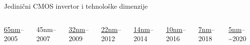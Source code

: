 \begin{frame}[label=09_2-s047]{Jedinični CMOS invertor i tehnološke dimenzije}
{\begin{columns}[T,onlytextwidth]
\href{https://en.wikipedia.org/wiki/65_nm_process}{{\color{DEplava}\underline{65nm}}}–2005
\par\smallskip
45nm–2007\raggedright \href{https://en.wikipedia.org/wiki/32_nm_process}{{\color{DEplava}\underline{32nm}}}–2009
\par\smallskip
\href{https://en.wikipedia.org/wiki/22_nm_process}{{\color{DEplava}\underline{22nm}}}–2012
\par\smallskip
\href{https://en.wikipedia.org/wiki/14_nm_process}{{\color{DEplava}\underline{14nm}}}–2014
\par\smallskip
\href{https://en.wikipedia.org/wiki/10_nm_process}{{\color{DEplava}\underline{10nm}}}–2016
\par\smallskip
\href{https://en.wikipedia.org/wiki/7_nm_process}{{\color{DEplava}\underline{7nm}}}–2018
\par\smallskip
\href{https://en.wikipedia.org/wiki/5_nm_process}{{\color{DEplava}\underline{5nm}}}–\textasciitilde{}2020\end{columns}}
\end{frame}
